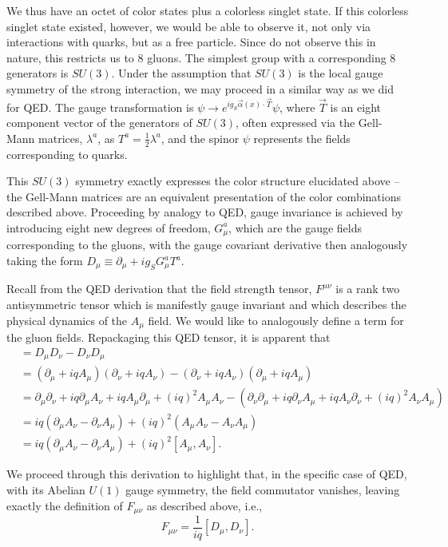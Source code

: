 We thus have an octet of color states plus a colorless singlet state. If this colorless singlet state 
existed, however, we would be able to observe it, not only via interactions with quarks, but as a free
particle. Since do not observe this in nature, this restricts us to $8$ gluons. The simplest group with 
a corresponding 8 generators is $SU(3)$. Under the assumption that $SU(3)$ is the local gauge symmetry
of the strong interaction, we may proceed in a similar way as we did for QED. The gauge transformation is 
$\psi \rightarrow e^{ig_{S}\vec{\alpha}(x)\cdot \vec{T}}\psi$, where $\vec{T}$ is an eight component vector
of the generators of $SU(3)$, often expressed via the Gell-Mann matrices, $\lambda^{a}$, as $T^{a} = \frac{1}{2}\lambda^{a}$,
and the spinor $\psi$ represents the fields corresponding to quarks.

This $SU(3)$ symmetry exactly expresses the color structure elucidated above -- the Gell-Mann matrices are an 
equivalent presentation of the color combinations described above. Proceeding by analogy to QED, gauge invariance 
is achieved by introducing eight new degrees of freedom, $G_{\mu}^{a}$, which are the gauge fields corresponding to 
the gluons, with the gauge covariant derivative then analogously taking the form 
$D_{\mu} \equiv \partial_{\mu} + ig_{S}G_{\mu}^{a}T^{a}$.

Recall from the QED derivation that the field strength tensor, $F^{\mu\nu}$ is a rank two antisymmetric
tensor which is manifestly gauge invariant and which describes the physical dynamics of the $A_{\mu}$ field.
We would like to analogously define a term for the gluon fields. Repackaging this QED tensor, it is apparent that
\begin{align}
[D_{\mu}, D_{\nu}] &= D_{\mu}D_{\nu} - D_{\nu}D_{\mu}\\
&= (\partial_{\mu} + iqA_{\mu})(\partial_{\nu} + iqA_{\nu}) - (\partial_{\nu} + iqA_{\nu})(\partial_{\mu} + iqA_{\mu})\\
&= \partial_{\mu}\partial_{\nu}+iq\partial_{\mu}A_{\nu} + iqA_{\mu}\partial_{\mu} + (iq)^2A_{\mu}A_{\nu} -
(\partial_{\nu}\partial_{\mu}+iq\partial_{\nu}A_{\mu} + iqA_{\nu}\partial_{\nu} + (iq)^2A_{\nu}A_{\mu})\\
&=iq(\partial_{\mu}A_{\nu}-\partial_{\nu}A_{\mu}) + (iq)^2(A_{\mu}A_{\nu}-A_{\nu}A_{\mu})\\
&=iq(\partial_{\mu}A_{\nu}-\partial_{\nu}A_{\mu})+(iq)^2[A_{\mu}, A_{\nu}].
\end{align}

We proceed through this derivation to highlight that, in the specific case of QED, with its Abelian $U(1)$ gauge
symmetry, the field commutator vanishes, leaving exactly the definition of $F_{\mu\nu}$ as described above, i.e.,
\begin{equation}
F_{\mu\nu} = \frac{1}{iq}[D_{\mu}, D_{\nu}].
\end{equation}

